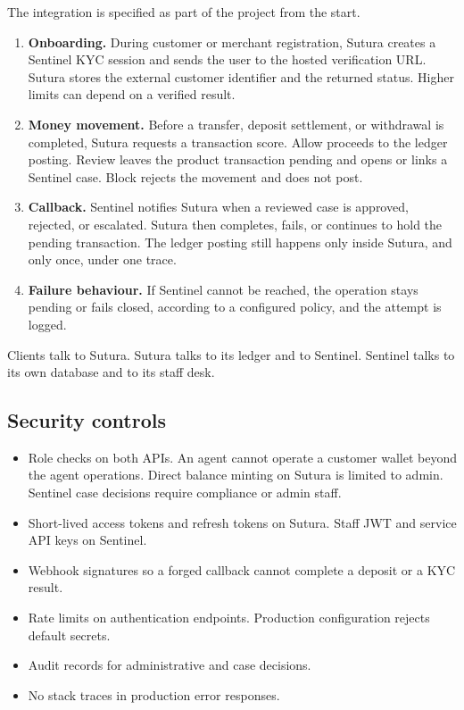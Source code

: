 \documentclass[12pt,a4paper]{article}
\begin{document}
The integration is specified as part of the project from the start.

\begin{enumerate}
  \item \textbf{Onboarding.} During customer or merchant registration, Sutura creates a Sentinel KYC session and sends the user to the hosted verification URL. Sutura stores the external customer identifier and the returned status. Higher limits can depend on a verified result.
  \item \textbf{Money movement.} Before a transfer, deposit settlement, or withdrawal is completed, Sutura requests a transaction score. Allow proceeds to the ledger posting. Review leaves the product transaction pending and opens or links a Sentinel case. Block rejects the movement and does not post.
  \item \textbf{Callback.} Sentinel notifies Sutura when a reviewed case is approved, rejected, or escalated. Sutura then completes, fails, or continues to hold the pending transaction. The ledger posting still happens only inside Sutura, and only once, under one trace.
  \item \textbf{Failure behaviour.} If Sentinel cannot be reached, the operation stays pending or fails closed, according to a configured policy, and the attempt is logged.
\end{enumerate}

Clients talk to Sutura. Sutura talks to its ledger and to Sentinel. Sentinel talks to its own database and to its staff desk.

\subsection{Security controls}

\begin{itemize}
  \item Role checks on both APIs. An agent cannot operate a customer wallet beyond the agent operations. Direct balance minting on Sutura is limited to admin. Sentinel case decisions require compliance or admin staff.
  \item Short-lived access tokens and refresh tokens on Sutura. Staff JWT and service API keys on Sentinel.
  \item Webhook signatures so a forged callback cannot complete a deposit or a KYC result.
  \item Rate limits on authentication endpoints. Production configuration rejects default secrets.
  \item Audit records for administrative and case decisions.
  \item No stack traces in production error responses.
\end{itemize}
\end{document}
